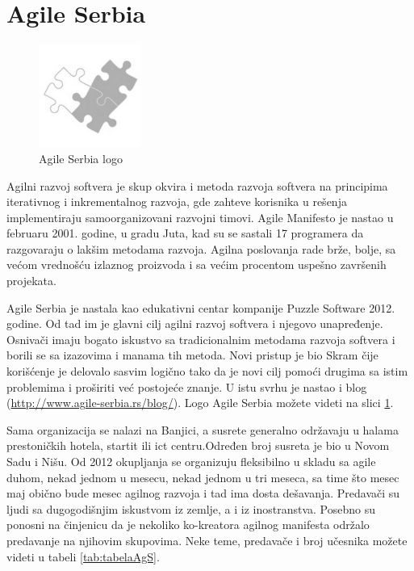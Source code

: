 \documentclass[a4paper]{article}
\begin{document}
{\section{Agile Serbia}
\label{sec:agsrb}

\begin{figure}[h]
  \centering
  \includegraphics[width=0.3\textwidth]{agile_srb.png}
  \caption{Agile Serbia logo}
  \label{fig:agslogo}
\end{figure}

Agilni razvoj softvera je skup okvira i metoda razvoja softvera na principima iterativnog i inkrementalnog razvoja, gde zahteve korisnika u rešenja implementiraju samoorganizovani razvojni timovi. Agile Manifesto je nastao u februaru 2001. godine, u gradu Juta, kad su se sastali 17 programera da razgovaraju o lakšim metodama razvoja. Agilna poslovanja rade brže, bolje, sa većom vrednošću izlaznog proizvoda i sa većim procentom uspešno završenih projekata.

Agile Serbia je nastala kao edukativni centar kompanije Puzzle Software 2012. godine. Od tad im je glavni cilj agilni razvoj softvera i njegovo unapređenje. Osnivači imaju bogato iskustvo sa tradicionalnim metodama razvoja softvera i borili se sa izazovima i manama tih metoda. Novi pristup je bio Skram čije korišćenje je delovalo sasvim logično tako da je novi cilj pomoći drugima sa istim problemima i proširiti već postojeće znanje. U istu svrhu je nastao i blog (\url{http://www.agile-serbia.rs/blog/}). Logo Agile Serbia možete videti na slici \ref{fig:agslogo}.

Sama organizacija se nalazi na Banjici, a susrete generalno održavaju u halama prestoničkih hotela, startit ili ict centru.Određen broj susreta je bio u Novom Sadu i Nišu. Od 2012 okupljanja se organizuju fleksibilno u skladu sa agile duhom, nekad jednom u mesecu, nekad jednom u tri meseca, sa time što mesec maj obično bude mesec agilnog razvoja i tad ima dosta dešavanja. Predavači su ljudi sa dugogodišnjim iskustvom iz zemlje, a i iz inostranstva. Posebno su ponosni na činjenicu da je nekoliko ko-kreatora agilnog manifesta održalo predavanje na njihovim skupovima. Neke teme, predavače i broj učesnika možete videti u tabeli \ref{tab:tabelaAgS}.

}
\end{document}
